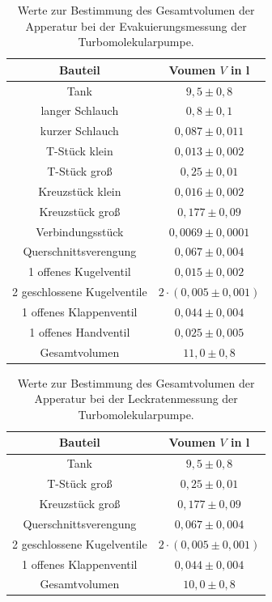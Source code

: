 \begin{table}[H]
\centering
\caption{Werte zur Bestimmung des Gesamtvolumen der Apperatur bei der Evakuierungsmessung der Turbomolekularpumpe.}
\label{tab:Volumen_ET}
\begin{tabular}{c|c}
Bauteil & Voumen $V$ in l\\
\hline
Tank &$9,5 \pm 0,8$\\
langer Schlauch &$0,8 \pm 0,1$\\
kurzer Schlauch &$0,087 \pm 0,011$\\
T-Stück klein&$0,013 \pm 0,002$\\
T-Stück groß &$0,25 \pm 0,01$\\
Kreuzstück klein&$0,016 \pm 0,002$\\
Kreuzstück groß&$0,177 \pm 0,09$\\
Verbindungsstück&$0,0069 \pm 0,0001$\\
Querschnittsverengung&$0,067 \pm 0,004$\\
1 offenes Kugelventil&$0,015 \pm 0,002$\\
2 geschlossene Kugelventile&$ 2 \cdot(0,005 \pm 0,001)$\\
1 offenes Klappenventil&$0,044 \pm 0,004$\\
1 offenes Handventil&$0,025\pm0,005$\\
\hline
Gesamtvolumen&$11,0 \pm 0,8$\\
\end{tabular}
\end{table}

\begin{table}[H]
\centering
\caption{Werte zur Bestimmung des Gesamtvolumen der Apperatur bei der Leckratenmessung der Turbomolekularpumpe.}
\label{tab:Volumen_LT}
\begin{tabular}{c|c}
Bauteil & Voumen $V$ in l\\
\hline
Tank &$9,5 \pm 0,8$\\
T-Stück groß &$0,25 \pm 0,01$\\
Kreuzstück groß&$0,177 \pm 0,09$\\
Querschnittsverengung&$0,067 \pm 0,004$\\
2 geschlossene Kugelventile&$ 2 \cdot(0,005 \pm 0,001)$\\
1 offenes Klappenventil&$0,044 \pm 0,004$\\
\hline
Gesamtvolumen&$10,0\pm0,8$\\
\end{tabular}
\end{table}

